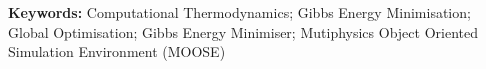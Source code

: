 %

\bigskip
\bigskip
\bigskip
\bigskip

\noindent
\textbf{Keywords:} Computational Thermodynamics; Gibbs Energy Minimisation; Global Optimisation; {\YJ} Gibbs Energy Minimiser; Mutiphysics Object Oriented Simulation Environment (MOOSE)
